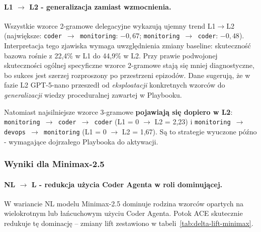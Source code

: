 \paragraph{L1 $\to$ L2 - generalizacja zamiast wzmocnienia.}
Wszystkie wzorce 2-gramowe delegacyjne wykazują ujemny trend L1$\to$L2 (największe: \texttt{coder $\to$ monitoring}: $-0{,}67$; \texttt{monitoring $\to$ coder}: $-0{,}48$). Interpretacja tego zjawiska wymaga uwzględnienia zmiany baseline: skuteczność bazowa rośnie z 22,4\% w L1 do 44,9\% w L2. Przy prawie podwojonej skuteczności ogólnej specyficzne wzorce 2-gramowe stają się mniej diagnostyczne, bo sukces jest szerzej rozproszony po przestrzeni epizodów. Dane sugerują, że w fazie L2 GPT-5-nano przeszedł od \emph{eksploatacji} konkretnych wzorców do \emph{generalizacji} wiedzy proceduralnej zawartej w Playbooku.

Natomiast najsilniejsze wzorce 3-gramowe \textbf{pojawiają się dopiero w L2}: \texttt{monitoring $\to$ coder $\to$ coder} (L1 = 0 $\to$ L2 = 2,23) i \texttt{monitoring $\to$ devops $\to$ monitoring} (L1 = 0 $\to$ L2 = 1,67). Są to strategie wyuczone późno - wymagające dojrzałego Playbooka do aktywacji.

\subsubsection{Wyniki dla Minimax-2.5}

\paragraph{NL $\to$ L - redukcja użycia Coder Agenta w roli dominującej.}
W wariancie NL modelu Minimax-2.5 dominuje rodzina wzorców opartych na wielokrotnym lub łańcuchowym użyciu Coder Agenta. Potok ACE skutecznie redukuje tę dominację -- zmiany lift zestawiono w tabeli~\ref{tab:delta-lift-minimax}.

